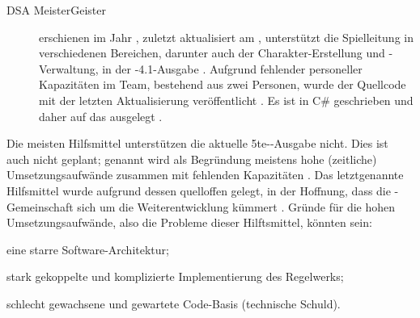 \begin{description}
    \item[DSA MeisterGeister] erschienen im Jahr , zuletzt aktualisiert am , unterstützt die Spielleitung in verschiedenen Bereichen, darunter auch der Charakter-Erstellung und -Verwaltung, in der -4.1-Ausgabe .
    Aufgrund fehlender personeller Kapazitäten im Team, bestehend aus zwei Personen, wurde der Quellcode mit der letzten Aktualisierung veröffentlicht .
    Es ist in C\# geschrieben und daher auf das   ausgelegt .
\end{description}

Die meisten Hilfsmittel unterstützen die aktuelle 5te--Ausgabe nicht.
Dies ist auch nicht geplant; genannt wird als Begründung meistens hohe (zeitliche) Umsetzungsaufwände zusammen mit fehlenden Kapazitäten .
Das letztgenannte Hilfsmittel wurde aufgrund dessen quelloffen gelegt, in der Hoffnung, dass die -Gemeinschaft sich um die Weiterentwicklung kümmert .
Gründe für die hohen Umsetzungsaufwände, also die Probleme dieser Hilftsmittel, könnten sein:
\begin{inparaenum}[\bfseries(a)]
    \item eine starre Software-Architektur;
    \item stark gekoppelte und komplizierte Implementierung des Regelwerks;
    \item schlecht gewachsene und gewartete Code-Basis (technische Schuld).
\end{inparaenum}
